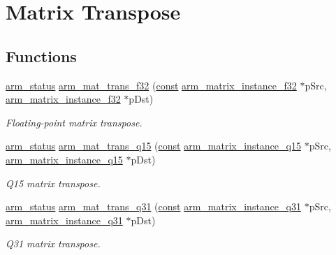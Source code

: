 \hypertarget{group___matrix_trans}{\section{Matrix Transpose}
\label{group___matrix_trans}
}
\subsection*{Functions}
\begin{DoxyCompactItemize}
\item 
\hyperlink{arm__math_8h_a5e459c6409dfcd2927bb8a57491d7cf6}{arm\-\_\-status} \hyperlink{group___matrix_trans_gad7dd9f108429da13d3864696ceeec789}{arm\-\_\-mat\-\_\-trans\-\_\-f32} (\hyperlink{group___n_a_m_e_ga7ae6d0e43244213b34de2c2b9aa30da6}{const} \hyperlink{structarm__matrix__instance__f32}{arm\-\_\-matrix\-\_\-instance\-\_\-f32} $\ast$p\-Src, \hyperlink{structarm__matrix__instance__f32}{arm\-\_\-matrix\-\_\-instance\-\_\-f32} $\ast$p\-Dst)
\begin{DoxyCompactList}\small\item\em Floating-\/point matrix transpose. \end{DoxyCompactList}\item 
\hyperlink{arm__math_8h_a5e459c6409dfcd2927bb8a57491d7cf6}{arm\-\_\-status} \hyperlink{group___matrix_trans_ga4f4f821cc695fd0ef9061d702e08050a}{arm\-\_\-mat\-\_\-trans\-\_\-q15} (\hyperlink{group___n_a_m_e_ga7ae6d0e43244213b34de2c2b9aa30da6}{const} \hyperlink{structarm__matrix__instance__q15}{arm\-\_\-matrix\-\_\-instance\-\_\-q15} $\ast$p\-Src, \hyperlink{structarm__matrix__instance__q15}{arm\-\_\-matrix\-\_\-instance\-\_\-q15} $\ast$p\-Dst)
\begin{DoxyCompactList}\small\item\em Q15 matrix transpose. \end{DoxyCompactList}\item 
\hyperlink{arm__math_8h_a5e459c6409dfcd2927bb8a57491d7cf6}{arm\-\_\-status} \hyperlink{group___matrix_trans_ga30a4d49489ac67ff98a46b9f58f73bf1}{arm\-\_\-mat\-\_\-trans\-\_\-q31} (\hyperlink{group___n_a_m_e_ga7ae6d0e43244213b34de2c2b9aa30da6}{const} \hyperlink{structarm__matrix__instance__q31}{arm\-\_\-matrix\-\_\-instance\-\_\-q31} $\ast$p\-Src, \hyperlink{structarm__matrix__instance__q31}{arm\-\_\-matrix\-\_\-instance\-\_\-q31} $\ast$p\-Dst)
\begin{DoxyCompactList}\small\item\em Q31 matrix transpose. \end{DoxyCompactList}\end{DoxyCompactItemize}


